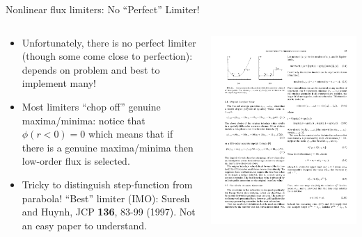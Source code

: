\documentclass[aspectratio=169]{beamer}
\begin{document}
\begin{frame}{Nonlinear flux limiters: No ``Perfect'' Limiter!}
  \small
  \begin{columns}
    \begin{column}{0.5\linewidth}
      \begin{itemize}
      \item Unfortunately, there is no perfect limiter (though some
        come close to perfection): depends on problem and best to
        implement many!
      \item Most limiters ``chop off'' genuine maxima/minima: notice
        that $\phi(r<0) = 0$ which means that if there is a genuine
        maxima/minima then low-order flux is selected.
      \item Tricky to distinguish step-function from parabola!
        ``Best'' limiter (IMO): Suresh and Huynh, JCP {\bf 136}, 83-99
        (1997). Not an easy paper to understand.
      \end{itemize}
    \end{column}
    
    \begin{column}{0.5\linewidth}
      \includegraphics[width=\linewidth]{suresh-huynh.pdf}
    \end{column}
  \end{columns}
\end{frame}
\end{document}
